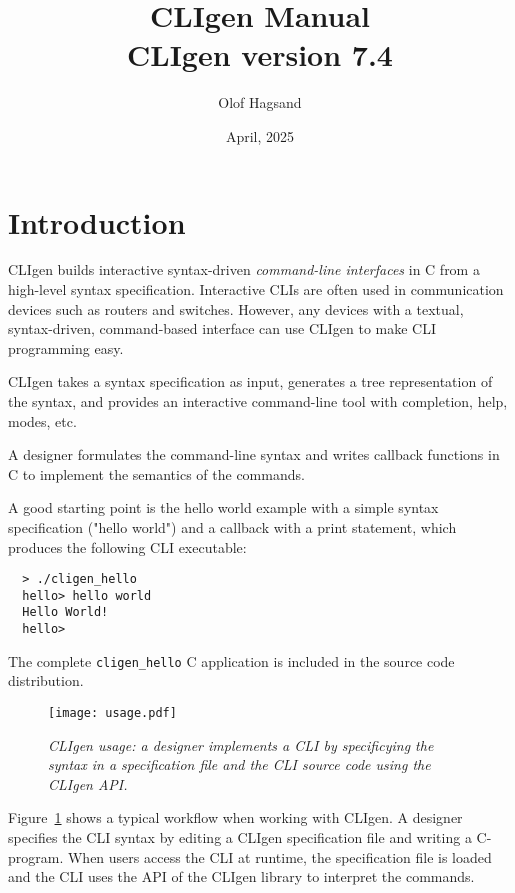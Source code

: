 \documentclass[a4paper, 10pt] {article}
\title {CLIgen Manual\\ {\small CLIgen version 7.4}}
\author{Olof Hagsand}
\begin{document}
\date{April, 2025}
\maketitle
\setcounter{tocdepth}{2}
\tableofcontents
\newpage
\section{Introduction}
\label{sec:intro}

CLIgen builds interactive syntax-driven \emph{command-line interfaces}
in C from a high-level syntax specification. Interactive CLIs are
often used in communication devices such as routers and
switches. However, any devices with a textual, syntax-driven,
command-based interface can use CLIgen to make CLI programming easy.

CLIgen takes a syntax specification as input, generates a tree
representation of the syntax, and provides an interactive command-line
tool with completion, help, modes, etc.

A designer formulates the command-line syntax and writes callback
functions in C to implement the semantics of the commands.

A good starting point is the hello world example with a simple syntax
specification ("hello world") and a callback with a print statement,
which produces the following CLI executable:

\begin{verbatim}
  > ./cligen_hello 
  hello> hello world 
  Hello World!
  hello> 
\end{verbatim}

The complete {\tt cligen\_hello} C application is included in the
source code distribution.

\begin{figure}
\centering
\texttt{[image: usage.pdf]}
\caption{\em CLIgen usage: a designer implements a CLI by specificying the syntax in a specification file and the CLI source code using the CLIgen API.}
\label{fig:usage}
\end{figure}

Figure~\ref{fig:usage} shows a typical workflow when working with
CLIgen. A designer specifies the CLI syntax by editing a CLIgen
specification file and writing a C-program. When users access the CLI
at runtime, the specification file is loaded and the CLI uses the API
of the CLIgen library to interpret the commands.
\end{document}
